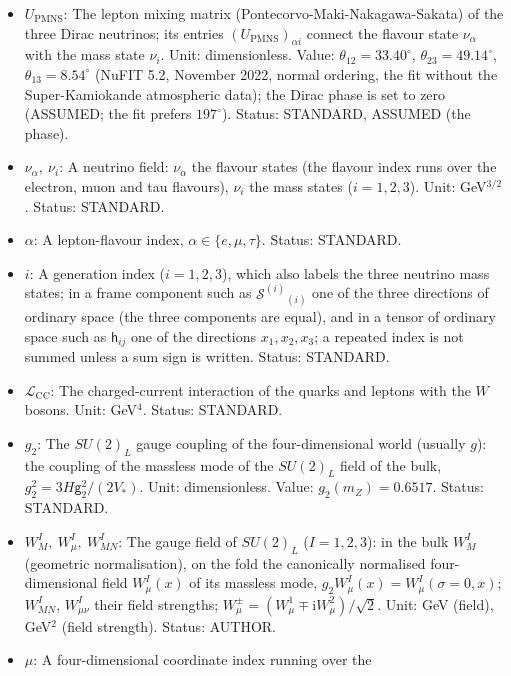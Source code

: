 \documentclass[
  10pt,
]{article}
\begin{document}
\begin{itemize}
\item
  \(U_{\mathrm{PMNS}}\): The lepton mixing matrix
  (Pontecorvo-Maki-Nakagawa-Sakata) of the three Dirac neutrinos; its
  entries \((U_{\mathrm{PMNS}})_{\alpha i}\) connect the flavour state
  \(\nu_\alpha\) with the mass state \(\nu_i\). Unit: dimensionless.
  Value: \(\theta_{12} = 33.40^\circ\), \(\theta_{23} = 49.14^\circ\),
  \(\theta_{13} = 8.54^\circ\) (NuFIT 5.2, November 2022, normal
  ordering, the fit without the Super-Kamiokande atmospheric data); the
  Dirac phase is set to zero (ASSUMED; the fit prefers \(197^\circ\)).
  Status: STANDARD, ASSUMED (the phase).
\item
  \(\nu_\alpha,\ \nu_i\): A neutrino field: \(\nu_\alpha\) the flavour
  states (the flavour index runs over the electron, muon and tau
  flavours), \(\nu_i\) the mass states (\(i = 1, 2, 3\)). Unit:
  GeV\(^{3/2}\). Status: STANDARD.
\item
  \(\alpha\): A lepton-flavour index, \(\alpha \in \{e, \mu, \tau\}\).
  Status: STANDARD.
\item
  \(i\): A generation index (\(i = 1, 2, 3\)), which also labels the
  three neutrino mass states; in a frame component such as
  \(\mathcal{S}^{(i)}{}_{(i)}\) one of the three directions of ordinary
  space (the three components are equal), and in a tensor of ordinary
  space such as \(\mathsf{h}_{ij}\) one of the directions
  \(x_1, x_2, x_3\); a repeated index is not summed unless a sum sign is
  written. Status: STANDARD.
\item
  \(\mathcal{L}_{\mathrm{CC}}\): The charged-current interaction of the
  quarks and leptons with the \(W\) bosons. Unit: GeV\(^4\). Status:
  STANDARD.
\item
  \(g_2\): The \(SU(2)_L\) gauge coupling of the four-dimensional world
  (usually \(g\)): the coupling of the massless mode of the \(SU(2)_L\)
  field of the bulk, \(g_2^2 = 3H\mathsf{g}_2^2/(2V_*)\). Unit:
  dimensionless. Value: \(g_2(m_Z) = 0.6517\). Status: STANDARD.
\item
  \(W^I_M,\ W^I_\mu,\ W^I_{MN}\): The gauge field of \(SU(2)_L\)
  (\(I = 1, 2, 3\)): in the bulk \(W^I_M\) (geometric normalisation), on
  the fold the canonically normalised four-dimensional field
  \(W^I_\mu(x)\) of its massless mode,
  \(g_2W^I_\mu(x) = W^I_\mu(\sigma = 0, x)\); \(W^I_{MN}\),
  \(W^I_{\mu\nu}\) their field strengths;
  \(W^\pm_\mu = (W^1_\mu \mp \mathrm{i}W^2_\mu)/\sqrt2\). Unit: GeV
  (field), GeV\(^2\) (field strength). Status: AUTHOR.
\item
  \(\mu\): A four-dimensional coordinate index running over the

\end{itemize}
\end{document}
